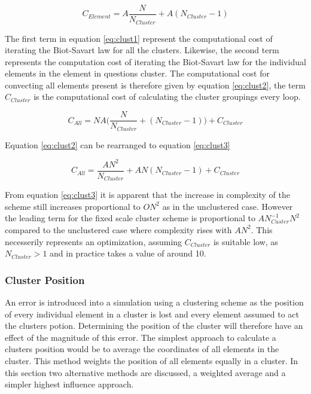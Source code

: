 \begin{equation}
\label{eq:clust1}
C_{Element}=A\frac{N}{N_{Cluster}}+A(N_{Cluster}-1)
\end{equation}

The first term in equation \ref{eq:clust1} represent the computational cost of iterating the Biot-Savart law for all the clusters. Likewise, the second term represents the computation cost of iterating the Biot-Savart law for the individual elements in the element in questions cluster. The computational cost for convecting all elements present is therefore given by equation \ref{eq:clust2}, the term $C_{Cluster}$ is the computational cost of calculating the cluster groupings every loop.

\begin{equation}
\label{eq:clust2}
C_{All}=NA\Big(\frac{N}{N_{Cluster}}+(N_{Cluster}-1)\Big)+C_{Cluster}
\end{equation}

Equation \ref{eq:clust2} can be rearranged to equation \ref{eq:clust3}

\begin{equation}
\label{eq:clust3}
C_{All}=\frac{AN^2}{N_{Cluster}}+AN(N_{Cluster}-1)+C_{Cluster}
\end{equation}

From equation \ref{eq:clust3} it is apparent that the increase in complexity of the scheme still increases proportional to $ON^2$ as in the unclustered case. However the leading term for the fixed scale cluster scheme is proportional to $AN^{-1}_{Custer}N^2$ compared to the unclustered case where complexity rises with $AN^2$. This necesserily represents an optimization, assuming $C_{Cluster}$ is suitable low, as $N_{Cluster}>1$ and in practice takes a value of around 10.

\subsubsection{Cluster Position}
An error is introduced into a simulation using a clustering scheme as the position of every individual element in a cluster is lost and every element assumed to act the clusters potion. Determining the position of the cluster will therefore have an effect of the magnitude of this error. The simplest approach to calculate a clusters position would be to average the coordinates of all elements in the cluster. This method weights the position of all elements equally in a cluster. In this section two alternative methods are discussed, a weighted average and a simpler highest influence approach.
\\\\











